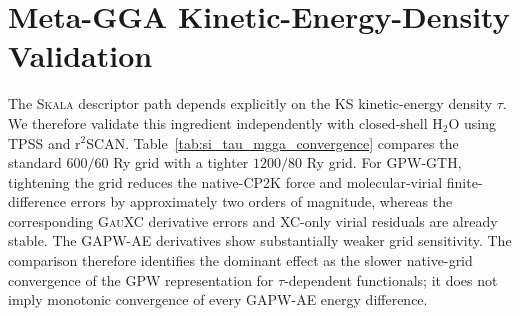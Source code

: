 \documentclass[10pt]{article}
\newcommand{\Skala}{\textsc{Skala}}
\newcommand{\GauXC}{\textsc{GauXC}}
\newcommand{\CPtwoK}{\textsc{CP2K}}
\newcommand{\GPW}{\textsc{GPW}}
\newcommand{\GAPW}{\textsc{GAPW}}
\newcommand{\GTH}{\textsc{GTH}}
\newcommand{\GPWGTH}{\GPW{}-\GTH{}}
\newcommand{\GAPWAE}{\GAPW{}-AE}
\begin{document}
\section{{Meta-GGA Kinetic-Energy-Density Validation}}

\begingroup

The \Skala{} descriptor path depends explicitly on the KS kinetic-energy density \(\tau\).  We therefore validate this ingredient independently with closed-shell H$_2$O using TPSS\cite{Tao2003TPSS} and r$^2$SCAN.\cite{Furness2020R2SCAN}  Table~\ref{tab:si_tau_mgga_convergence} compares the standard \(600/60\) Ry grid with a tighter \(1200/80\) Ry grid.  For \GPWGTH{}, tightening the grid reduces the native-\CPtwoK{} force and molecular-virial finite-difference errors by approximately two orders of magnitude, whereas the corresponding \GauXC{} derivative errors and XC-only virial residuals are already stable.  The \GAPWAE{} derivatives show substantially weaker grid sensitivity.  The comparison therefore identifies the dominant effect as the slower native-grid convergence of the GPW representation for \(\tau\)-dependent functionals; it does not imply monotonic convergence of every \GAPWAE{} energy difference.
\end{document}

